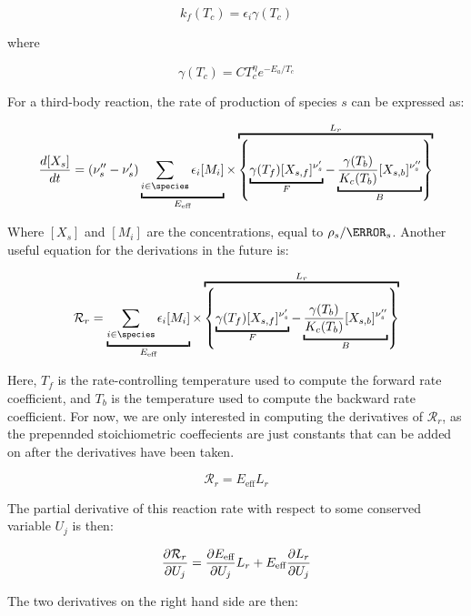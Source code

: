 \documentclass[10pt]{article}
\begin{document}
\begin{flushleft}
\begin{equation}
    k_f(T_c) = \epsilon_i \gamma(T_c) 
\end{equation}

where 

\begin{equation}
    \gamma(T_c) = C T_c^\eta e^{-E_a/T_c}
\end{equation}

For a third-body reaction, the rate of production of species $s$ can be expressed as:

\begin{equation}
    \frac{d [X_s]}{dt} = (\nu_s'' - \nu_s') \underbracket{\sum_{i \in \species} \epsilon_i [M_i]}_{E_\text{eff}} \times \overbracket{\left \{ \underbracket{\gamma(T_f) [X_{s,f}]^{\nu_s'}}_{F} - \underbracket{\frac{\gamma(T_b)}{K_c(T_b)} [X_{s,b}]^{\nu_s''}}_{B} \right \}}^{L_r}
\end{equation}

Where $[X_s]$ and $[M_i]$ are the concentrations, equal to $\rho_s / \MW_s$. Another useful equation for the derivations in the future is:

\begin{equation}
    \mathcal{R}_r = \underbracket{\sum_{i \in \species} \epsilon_i [M_i]}_{E_\text{eff}} \times \overbracket{\left \{ \underbracket{\gamma(T_f) [X_{s,f}]^{\nu_s'}}_{F} - \underbracket{\frac{\gamma(T_b)}{K_c(T_b)} [X_{s,b}]^{\nu_s''}}_{B} \right \}}^{L_r}
\end{equation}

Here, $T_f$ is the rate-controlling temperature used to compute the forward rate coefficient, and $T_b$ is the temperature used to compute the backward rate coefficient. For now, we are only interested in computing the derivatives of $\mathcal{R}_r$, as the prepennded stoichiometric coeffecients are just constants that can be added on after the derivatives have been taken.

\begin{equation}
    \mathcal{R}_r = E_\text{eff} L_r
\end{equation}

The partial derivative of this reaction rate with respect to some conserved variable $U_j$ is then:

\begin{equation}
    \frac{\partial \mathcal{R}_r}{\partial U_j} = \frac{\partial E_\text{eff}}{\partial U_j} L_r + E_\text{eff} \frac{\partial L_r}{\partial U_j}
\end{equation}

The two derivatives on the right hand side are then:


\end{flushleft}
\end{document}
